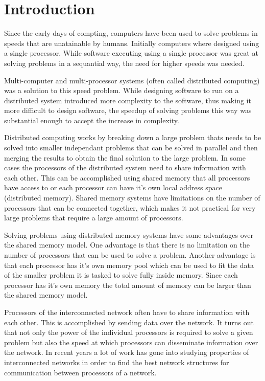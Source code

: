 \setcounter{page}{1}

\chapter{Introduction}

Since the early days of compting, computers have been used to solve problems in speeds that are unatainable by humans. Initially computers where designed using a single processor. While software executing using a single processor was great at solving problems in a sequantial way, the need for higher speeds was needed.

Multi-computer and multi-processor systems (often called distributed computing) was a solution to this speed problem. While designing software to run on a distributed system introduced more complexity to the software, thus making it more difficult to design software, the speedup of solving problems this way was substantial enough to accept the increase in complexity.

Distributed computing works by breaking down a large problem thats needs to be solved into smaller independant problems that can be solved in parallel and then merging the results to obtain the final solution to the large problem. In some cases the processors of the distributed system need to share information with each other. This can be accomplished using shared memory that all processors have access to or each processor can have it's own local address space (distributed memory). Shared memory systems have limitations on the number of processors that can be connected together, which makes it not practical for very large problems that require a large amount of processors.

Solving problems using distributed memory systems have some advantages over the shared memory model. One advantage is that there is no limitation on the number of processors that can be used to solve a problem. Another advantage is that each processor has it's own memory pool which can be used to fit the data of the smaller problem it is tasked to solve fully inside memory. Since each processor has it's own memory the total amount of memory can be larger than the shared memory model.

Processors of the interconnected network often have to share information with each other. This is accomplished by sending data over the network. It turns out that not only the power of the individual processors is required to solve a given problem but also the speed at which processors can disseminate information over the network. In recent years a lot of work has gone into studying properties of interconnected networks in order to find the best network structures for communication between processors of a network.

